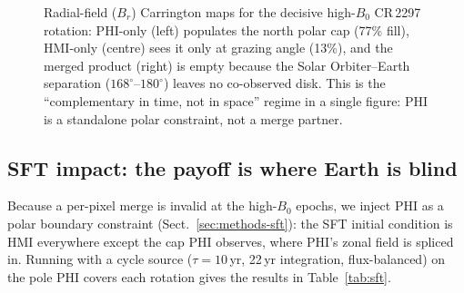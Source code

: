 \documentclass{aa}
\begin{document}
\begin{figure}
\centering
\caption{Radial-field ($B_r$) Carrington maps for the decisive high-$B_0$ CR\,2297 rotation: PHI-only (left) populates the north polar cap (77\% fill), HMI-only (centre) sees it only at grazing angle (13\%), and the merged product (right) is empty because the Solar Orbiter--Earth separation ($168^{\circ}$--$180^{\circ}$) leaves no co-observed disk. This is the ``complementary in time, not in space'' regime in a single figure: PHI is a standalone polar constraint, not a merge partner.}
\label{fig:mapshighb0}
\end{figure}

\subsection{SFT impact: the payoff is where Earth is blind}
\label{sec:results-sft}

Because a per-pixel merge is invalid at the high-$B_0$ epochs, we inject PHI as a polar boundary constraint (Sect.~\ref{sec:methods-sft}): the SFT initial condition is HMI everywhere except the cap PHI observes, where PHI's zonal field is spliced in. Running with a cycle source ($\tau = 10$\,yr, 22\,yr integration, flux-balanced) on the pole PHI covers each rotation gives the results in Table~\ref{tab:sft}.
\end{document}
